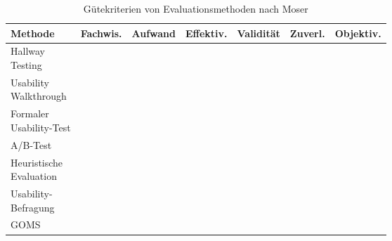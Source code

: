 \begin{table}[H]
		\begin{tabular}{|l|c|c|c|c|c|c|}
			\hline
			\textbf{Methode}&\textbf{Fachwis.}&\textbf{Aufwand}&\textbf{Effektiv.}&\textbf{Validität}&\textbf{Zuverl.}&\textbf{Objektiv.}\\
			\hline
			\twolinecell{Hallway\\Testing} & \star & \star & \star \star & \star & \star & \star\\
			\hline
			\twolinecell{Usability\\Walkthrough} & \star \star & \star \star & \star \star & \star \star & \star & \star\\
			\hline
			\twolinecell{Formaler\\Usability-Test} & \star \star & \star \star \star & \star \star \star & \star \star \star & \star \star & \star \star\\
			\hline								
			\twolinecell{A/B-Test\\[2.3ex]} & \star \star & \star \star & \star \star & \star \star \star & \star \star & \star \star \star\\
			\hline
			\twolinecell{Heuristische\\Evaluation} & \star \star \star & \star & \star \star \star & \star \star & \star \star \star & \star\\
			\hline
			\twolinecell{Usability-\\Befragung} & \star & \star & \star & \star \star & \star \star & \star \star \star\\
			\hline
			\twolinecell{GOMS\\[2.3ex]} & \star \star & \star \star & \star & \star \star & \star \star \star & \star \star \star\\
			\hline
		\end{tabular}
		\caption[Gütekriterien von Evaluationsmethoden]{Gütekriterien von Evaluationsmethoden nach Moser \cite[S. 225]{Moser2012}}
	\label{tab:hallwayTesting}
\end{table}
